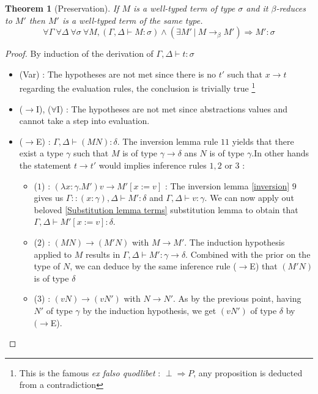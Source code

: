 \documentclass{article}
\newtheorem{theorem}{Theorem}[section]
\begin{document}
    \begin{theorem}[Preservation]
    If $M$ is a well-typed term of type $\sigma$ and it $\beta$-reduces to $M'$ then $M'$ is a well-typed term of the same type.
    $$\forall\Gamma\ \forall\Delta\ \forall\sigma\ \forall M, (\Gamma,\Delta\vdash M : \sigma) \wedge (\exists M' \ | \  M\rightarrow_\beta M') \Rightarrow M' : \sigma$$
    \end{theorem}
    \begin{proof}
        By induction of the derivation of $\Gamma,\Delta\vdash t : \sigma$
        \begin{itemize}
            \item (Var) : The hypotheses are not met since there is no $t'$ such that $x\rightarrow t$ regarding the evaluation rules, the conclusion is trivially true \footnote{This is the famous \textit{ex falso quodlibet} : $\perp\Rightarrow P$, any proposition is deducted from a contradiction}
            
            \item ($\rightarrow$I), ($\forall$I) : The hypotheses are not met since abstractions values and cannot take a step into evaluation.
            
            \item ($ \rightarrow$E) : $ \Gamma,\Delta\vdash (M N) : \delta $. The inversion lemma rule $11$ yields that there exist a type $\gamma$ such that $M$ is of type $\gamma\rightarrow\delta$ ans $N$ is of type $\gamma$.In other hands the statement $t\rightarrow t'$ would implies inference rules $1,2$ or $3$ :
            \begin{itemize}
                \item ($1$) : $(\lambda x : \gamma.M') v \rightarrow M'[x:=v]$ : The inversion lemma \ref{inversion} $9$ gives us $\Gamma::(x:\gamma),\Delta\vdash M' : \delta$ and $\Gamma,\Delta\vdash v : \gamma$. We can now apply out beloved \ref{Substitution lemma terms} substitution lemma to obtain that $\Gamma,\Delta\vdash M'[x:=v] : \delta$.

                \item ($2$) : $(M N) \rightarrow (M' N)$ with $M \rightarrow M'$. The induction hypothesis applied to $M$ results in $\Gamma,\Delta\vdash M' : \gamma\rightarrow\delta$. Combined with the prior on the type of $N$, we can deduce by the same inference rule ($\rightarrow $E) that $(M' N)$ is of type $\delta$

                \item ($3$) : $(v N)\rightarrow (v N') $ with $N\rightarrow N'$. As by the previous point, having $N'$ of type $\gamma$ by the induction hypothesis, we get $(v N')$ of type $\delta$ by $(\rightarrow$E).
            \end{itemize}


\end{itemize}
\end{proof}
\end{document}
